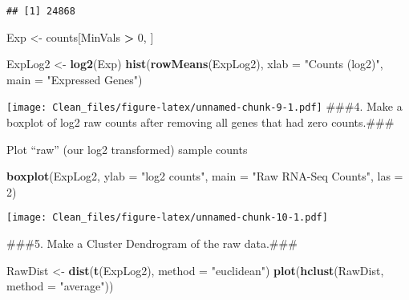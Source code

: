 \documentclass[
]{article}
\newenvironment{Shaded}{\begin{snugshade}}{\end{snugshade}}
\newcommand{\AttributeTok}[1]{\textcolor[rgb]{0.13,0.29,0.53}{#1}}
\newcommand{\DecValTok}[1]{\textcolor[rgb]{0.00,0.00,0.81}{#1}}
\newcommand{\FunctionTok}[1]{\textcolor[rgb]{0.13,0.29,0.53}{\textbf{#1}}}
\newcommand{\NormalTok}[1]{#1}
\newcommand{\OtherTok}[1]{\textcolor[rgb]{0.56,0.35,0.01}{#1}}
\newcommand{\SpecialCharTok}[1]{\textcolor[rgb]{0.81,0.36,0.00}{\textbf{#1}}}
\newcommand{\StringTok}[1]{\textcolor[rgb]{0.31,0.60,0.02}{#1}}
\begin{document}
\begin{verbatim}
## [1] 24868
\end{verbatim}

\begin{Shaded}
\begin{Highlighting}[]
\NormalTok{Exp }\OtherTok{\textless{}{-}}\NormalTok{ counts[MinVals }\SpecialCharTok{\textgreater{}} \DecValTok{0}\NormalTok{, ]}
\end{Highlighting}
\end{Shaded}

\begin{Shaded}
\begin{Highlighting}[]
\NormalTok{ExpLog2 }\OtherTok{\textless{}{-}} \FunctionTok{log2}\NormalTok{(Exp)}
\FunctionTok{hist}\NormalTok{(}\FunctionTok{rowMeans}\NormalTok{(ExpLog2), }\AttributeTok{xlab =} \StringTok{"Counts (log2)"}\NormalTok{, }\AttributeTok{main =} \StringTok{"Expressed Genes"}\NormalTok{)}
\end{Highlighting}
\end{Shaded}

\texttt{[image: Clean\_files/figure-latex/unnamed-chunk-9-1.pdf]}
\#\#\#4. Make a boxplot of log2 raw counts after removing all genes that
had zero counts.\#\#\#

Plot ``raw'' (our log2 transformed) sample counts

\begin{Shaded}
\begin{Highlighting}[]
\FunctionTok{boxplot}\NormalTok{(ExpLog2, }\AttributeTok{ylab =} \StringTok{"log2 counts"}\NormalTok{, }\AttributeTok{main =} \StringTok{"Raw RNA{-}Seq Counts"}\NormalTok{, }\AttributeTok{las =} \DecValTok{2}\NormalTok{)}
\end{Highlighting}
\end{Shaded}

\texttt{[image: Clean\_files/figure-latex/unnamed-chunk-10-1.pdf]}

\#\#\#5. Make a Cluster Dendrogram of the raw data.\#\#\#

\begin{Shaded}
\begin{Highlighting}[]
\NormalTok{RawDist }\OtherTok{\textless{}{-}} \FunctionTok{dist}\NormalTok{(}\FunctionTok{t}\NormalTok{(ExpLog2), }\AttributeTok{method =} \StringTok{"euclidean"}\NormalTok{)}
\FunctionTok{plot}\NormalTok{(}\FunctionTok{hclust}\NormalTok{(RawDist, }\AttributeTok{method =} \StringTok{"average"}\NormalTok{))}
\end{Highlighting}
\end{Shaded}
\end{document}
